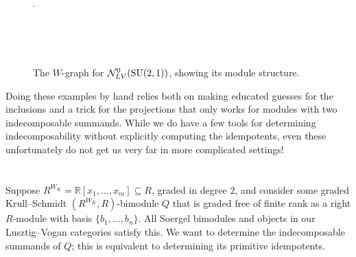 \noindent\\[4\linespacing]
\begin{center}
\begin{figure}[!ht]
\begin{center}
\noindent\\[-2\linespacing]\qquad\qquad\qquad\qquad\qquad\qquad\qquad\qquad\qquad\qquad\qquad.
\end{center}
\noindent\\[6\linespacing]\caption{The $W$-graph for $\mathcal{N}_{LV}^0(\textup{SU}(2, 1))$, showing its module structure.}\noindent\\[-0.5\linespacing]
\end{figure}
\end{center}

\noindent Doing these examples by hand relies both on making educated guesses for the inclusions and a trick for the projections that only works for modules with two indecomposable summands. While we do have a few tools for determining indecomposability without explicitly computing the idempotents, even these unfortunately do not get us very far in more complicated settings!\\\\

\noindent\\ Suppose $R^{W_K} = \mathbb{R}[x_1, \dots, x_m] \subseteq R$, graded in degree $2$, and consider some graded Krull--Schmidt $(R^{W_K}, R)$-bimodule $Q$ that is graded free of finite rank as a right $R$-module with basis $\{b_1, \dots, b_n\}$. All Soergel bimodules and objects in our Lusztig--Vogan categories satisfy this. We want to determine the indecomposable summands of $Q$; this is equivalent to determining its primitive idempotents.\\

